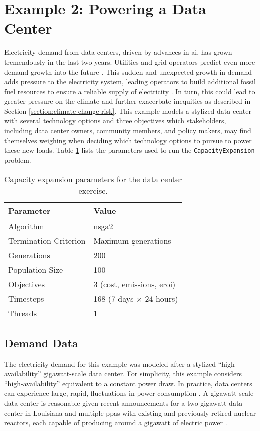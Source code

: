\section{Example 2: Powering a Data Center}

Electricity demand from data centers, driven by advances in \ac{ai}, has grown
tremendously in the last two years. Utilities and grid operators predict even
more demand growth into the future
\cite{pjm_resource_adequacy_planning_department_2024_2024,miso_long-term_2024,davenport_generational_2024}.
This sudden and unexpected growth in demand adds pressure to the electricity
system, leading operators to build additional fossil fuel resources to ensure a
reliable supply of electricity \cite{howland_ethan_pjm_2025}. In turn, this
could lead to greater pressure on the climate and further exacerbate inequities
as described in Section \ref{section:climate-change-risk}. This example models a
stylized data center with several technology options and three objectives which
stakeholders, including data center owners, community members, and policy
makers, may find themselves weighing when deciding which technology options to
pursue to power these new loads. Table \ref{tab:dc-params} lists the parameters
used to run the \texttt{CapacityExpansion} problem.

\begin{table}[htbp!]
    \centering
    \caption{Capacity expansion parameters for the data center exercise.}
    \label{tab:dc-params}
    \begin{tabular}{ll}
        \toprule
        Parameter & Value \\
        \midrule
        Algorithm & \acs{nsga2}\\
        Termination Criterion & Maximum generations\\
        Generations & 200 \\
        Population Size & 100 \\
        Objectives & 3 (cost, emissions, \acs{eroi})\\
        Timesteps & 168 (7 days $\times$ 24 hours) \\
        Threads & 1 \\
        \bottomrule
    \end{tabular}
\end{table}

\subsection{Demand Data}
The electricity demand for this example was modeled after a stylized
``high-availability'' gigawatt-scale data center. For simplicity, this example
considers ``high-availability'' equivalent to a constant power draw. In
practice, data centers can experience large, rapid, fluctuations in power
consumption \cite{quint_practical_2025}. A gigawatt-scale data center is
reasonable given recent announcements for a two gigawatt data center in
Louisiana \cite{swinhoe_meta_2024} and multiple \acp{ppa} with existing and
previously retired nuclear reactors, each capable of producing around a gigawatt
of electric power
\cite{shaw_microsoft_2024,constellation_energy_constellation_2025}.

